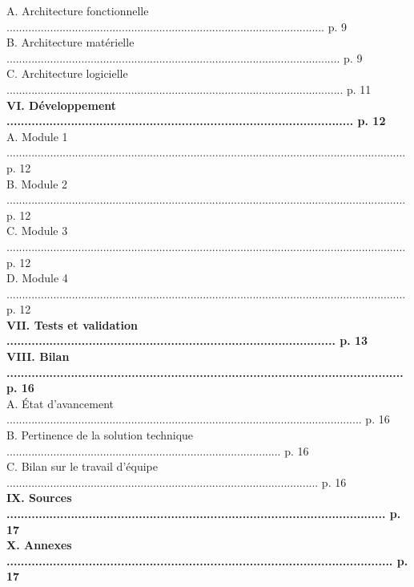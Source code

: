 \documentclass[a4paper,11pt]{book}
\begin{document}
\begin{tabbing}
A. Architecture fonctionnelle ...................................................................................................... p. 9\\
B. Architecture matérielle ........................................................................................................... p. 9\\
C. Architecture logicielle ............................................................................................................ p. 11\\
\textbf{{VI. Développement ................................................................................................. p. 12}}\\
A. Module 1 ................................................................................................................................ p. 12\\
B. Module 2 ................................................................................................................................ p. 12\\
C. Module 3 ................................................................................................................................ p. 12\\
D. Module 4 ................................................................................................................................ p. 12\\
\textbf{{VII. Tests et validation ............................................................................................ p. 13}}\\

\textbf{{VIII. Bilan ............................................................................................................... p. 16}}\\
A. État d'avancement .................................................................................................................. p. 16\\
B. Pertinence de la solution technique ........................................................................................ p. 16\\
C. Bilan sur le travail d'équipe .................................................................................................... p. 16\\
\textbf{{IX. Sources .......................................................................................................... p. 17}}\\
\textbf{{X. Annexes ............................................................................................................ p. 17}}\\
\end{tabbing}
\end{document}
